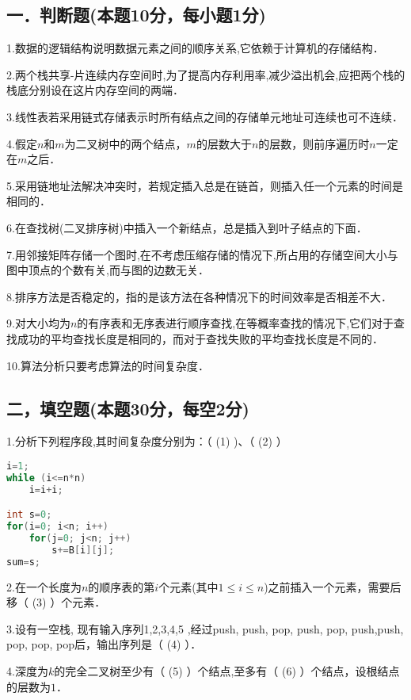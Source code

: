 
\subsection{一．判断题(本题10分，每小题1分)}

1.数据的逻辑结构说明数据元素之间的顺序关系,它依赖于计算机的存储结构．

2.两个栈共享-片连续内存空间时,为了提高内存利用率,减少溢出机会,应把两个栈的栈底分别设在这片内存空间的两端．

3.线性表若采用链式存储表示时所有结点之间的存储单元地址可连续也可不连续．

4.假定$n$和$m$为二叉树中的两个结点，$m$的层数大于$n$的层数，则前序遍历时$n$一定在$m$之后．

5.采用链地址法解决冲突时，若规定插入总是在链首，则插入任一个元素的时间是相同的．

6.在查找树(二叉排序树)中插入一个新结点，总是插入到叶子结点的下面．

7.用邻接矩阵存储一个图时,在不考虑压缩存储的情况下,所占用的存储空间大小与图中顶点的个数有关,而与图的边数无关．

8.排序方法是否稳定的，指的是该方法在各种情况下的时间效率是否相差不大．

9.对大小均为$n$的有序表和无序表进行顺序查找,在等概率查找的情况下,它们对于查找成功的平均查找长度是相同的，而对于查找失败的平均查找长度是不同的．

10.算法分析只要考虑算法的时间复杂度．

\subsection{二，填空题(本题30分，每空2分)}

1.分析下列程序段,其时间复杂度分别为：（ (1) )、（ (2) ）
\begin{lstlisting}[language=cpp]
i=1;
while (i<=n*n)
    i=i+i;

int s=0;
for(i=0; i<n; i++)
    for(j=0; j<n; j++)
        s+=B[i][j];
sum=s;
\end{lstlisting}

2.在一个长度为$n$的顺序表的第$i$个元素(其中$1\leqslant i\leqslant n$)之前插入一个元素，需要后移（ (3) ）个元素．

3.设有一空栈, 现有输入序列1,2,3,4,5 ,经过push, push, pop, push, pop, push,push, pop, pop, pop后，输出序列是（ (4) ）．

4.深度为$k$的完全二叉树至少有（ (5) ）个结点,至多有（ (6) ）个结点，设根结点的层数为$1$．

